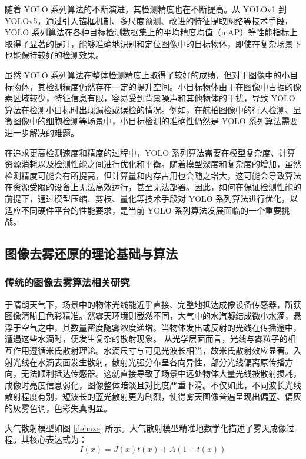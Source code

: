 随着 YOLO 系列算法的不断演进，其检测精度也在不断提高。从 YOLOv1 到 YOLOv5，通过引入锚框机制、多尺度预测、改进的特征提取网络等技术手段，YOLO 系列算法在各种目标检测数据集上的平均精度均值（mAP）等性能指标上取得了显著的提升，能够准确地识别和定位图像中的目标物体，即使在复杂场景下也能保持较好的检测效果。

虽然 YOLO 系列算法在整体检测精度上取得了较好的成绩，但对于图像中的小目标物体，其检测精度仍然存在一定的提升空间。小目标物体由于在图像中占据的像素区域较少，特征信息有限，容易受到背景噪声和其他物体的干扰，导致 YOLO 算法在检测小目标时出现漏检或误检的情况。例如，在航拍图像中的行人检测、显微图像中的细胞检测等场景中，小目标检测的准确性仍然是 YOLO 系列算法需要进一步解决的难题。

在追求更高检测速度和精度的过程中，YOLO 系列算法需要在模型复杂度、计算资源消耗以及检测性能之间进行优化和平衡。随着模型深度和复杂度的增加，虽然检测精度可能会有所提高，但计算量和内存占用也会随之增大，这可能会导致算法在资源受限的设备上无法高效运行，甚至无法部署。因此，如何在保证检测性能的前提下，通过模型压缩、剪枝、量化等技术手段对 YOLO 系列算法进行优化，以适应不同硬件平台的性能要求，是当前 YOLO 系列算法发展面临的一个重要挑战。


\subsection{图像去雾还原的理论基础与算法}

\subsubsection{传统的图像去雾算法相关研究}

于晴朗天气下，场景中的物体光线能近乎直接、完整地抵达成像设备传感器，所获图像清晰且色彩精准。然雾天环境则截然不同，大气中的水汽凝结成微小水滴，悬浮于空气之中，其数量密度随雾浓度递增。当物体发出或反射的光线在传播途中，遭遇这些水滴时，便发生复杂的散射现象。
从光学层面而言，光线与雾粒子的相互作用遵循米氏散射理论。水滴尺寸与可见光波长相当，故米氏散射效应显著。入射光线在水滴表面发生散射，散射光强分布呈各向异性，部分光线偏离原传播方向，无法顺利抵达传感器。这就直接导致了场景中远处物体大量光线被散射损耗，成像时亮度信息弱化，图像整体暗淡且对比度严重下滑。不仅如此，不同波长光线散射程度有别，短波长的蓝光散射更为剧烈，使得雾天图像普遍呈现出偏蓝、偏灰的灰雾色调，色彩失真明显。

大气散射模型如图 \ref{dehaze} 所示。大气散射模型精准地数学化描述了雾天成像过程。其核心表达式为：
\begin{equation}
    \label{eq:haze2}
    I(x) = J(x)t(x)+A(1-t(x))
\end{equation}

